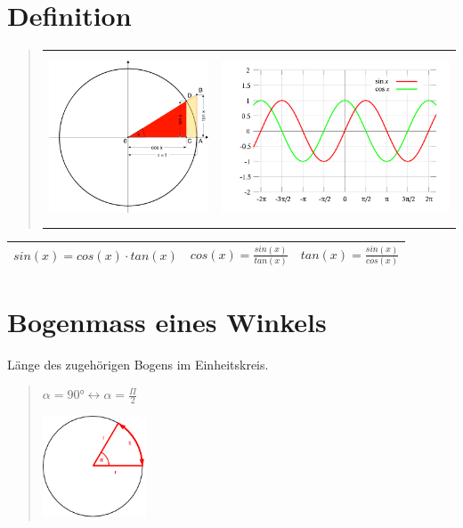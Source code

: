 \section*{Definition}
\begin{verse}
\begin{tabular}{ll}
\includegraphics[height=5cm]{Repetition/Einheitskreis} & \includegraphics[height=5cm]{Repetition/Sin_Cos}\tabularnewline
\end{tabular}
\end{verse}
\begin{tabular}{|c|c|c|}
\hline 
$sin(x)=cos(x)\cdot tan(x)$ & $cos(x)=\frac{sin(x)}{tan(x)}$ & $tan(x)=\frac{sin(x)}{cos(x)}$\tabularnewline
\hline 
\end{tabular}


\section*{Bogenmass eines Winkels}

Länge des zugehörigen Bogens im Einheitskreis.
\begin{verse}
$\alpha=90\text{°}\leftrightarrow\alpha=\frac{\Pi}{2}$

\includegraphics[height=3cm]{Repetition/Bogenmass}
\end{verse}

